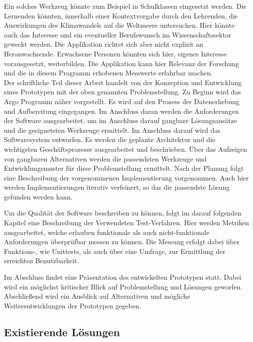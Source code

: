 Ein solches Werkzeug könnte zum Beispiel in Schulklassen eingesetzt werden. 
Die Lernenden könnten, innerhalb einer Kontextvorgabe durch den Lehrenden, die Auswirkungen des Klimawandels auf die Weltmeere untersuchen.
Hier könnte auch das Interesse und ein eventueller Berufswunsch im Wissenschaftssektor geweckt werden.
Die Applikation richtet sich aber nicht explizit an Heranwachsende. Erwachsene Personen könnten sich hier, eigenes Interesse vorausgesetzt, weiterbilden. Die Applikation kann hier Relevanz der Forschung und die in diesem Programm erhobenen Messwerte erfahrbar machen. \\


Der schriftliche Teil dieser Arbeit handelt von der Konzeption und Entwicklung eines Prototypen mit der oben genannten Problemstellung. Zu Beginn wird das Argo Programm näher vorgestellt. Es wird auf den Prozess der Datenerhebung und Aufbereitung eingegangen. Im Anschluss daran werden die Anforderungen der Software ausgearbeitet, um im Anschluss darauf gangbare Lösungsansätze und die geeignetsten Werkzeuge ermittelt.
Im Anschluss darauf wird das Softwaresystem entworfen. Es werden die geplante Architektur und die wichtigsten Geschäftsprozesse ausgearbeitet und beschrieben. Über das 
Aufzeigen von gangbaren Alternativen werden die passendsten Werkzeuge und Entwicklungsmuster für diese Problemstellung ermittelt.
Nach der Planung folgt eine Beschreibung der vorgenommenen Implementierung vorgenommen. Auch hier werden Implementierungen iterativ verfeinert, so das die passendste Lösung gefunden werden kann.

Um die Qualität der Software beschreiben zu können, folgt im darauf folgenden Kapitel eine Beschreibung der Verwendeten Test-Verfahren. Hier werden Metriken ausgearbeitet, welche erlauben funktionale als auch nicht-funktionale Anforderungen überprüfbar messen zu können. Die Messung erfolgt dabei über Funktions-, wie Unittests, als auch über eine Umfrage, zur Ermittlung der erreichten Benutzbarkeit. 

Im Abschluss findet eine Präsentation des entwickelten Prototypen statt. Dabei wird ein möglichst kritischer Blick auf Problemstellung und Lösungen geworfen. Abschließend wird ein Ausblick auf Alternativen und mögliche Weiterentwicklungen der Prototypen gegeben.



\subsection{Existierende Lösungen}

